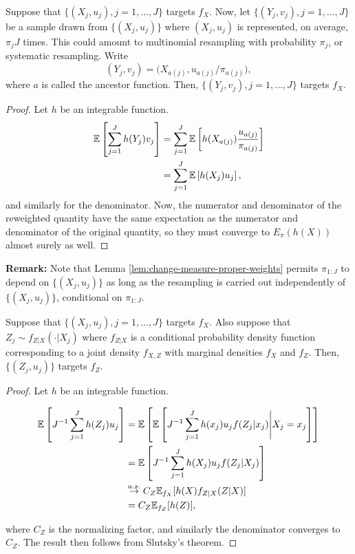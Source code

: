 \documentclass{article}
\begin{document}
\begin{lem}
    \label{lem:change-measure-proper-weights}
    Suppose that $\{(X_j,u_j),j=1,\dots,J\}$ targets $f_X$. Now, let $\{(Y_j,v_j),j=1,\dots,J\}$ be a sample drawn from $\{(X_j,u_j)\}$ where $(X_j,u_j)$ is represented, on average, $\pi_j J$ times. This could amount to multinomial resampling with probability $\pi_j$, or systematic resampling. Write
    \[
    (Y_j,v_j) = \big(X_{a(j)},u_{a(j)}/\pi_{a(j)}\big),
    \]
    where $a$ is called the ancestor function. Then, $\{(Y_j,v_j),j=1,\dots,J\}$ targets $f_X$.
\end{lem}

\begin{proof}
    Let $h$ be an integrable function. 
    \begin{align*}
        \mathbb{E}\left[\sum_{j=1}^J h(Y_j) v_j\right] 
        &= \sum_{j=1}^J \mathbb{E}\left[h(X_{a(j)}) \frac{u_{a(j)}}{\pi_{a(j)}}\right] \\
        &= \sum_{j=1}^J \mathbb{E}\left[h(X_{j}) u_{j}\right],
    \end{align*}
    and similarly for the denominator. Now, the numerator and denominator of the reweighted quantity have the same expectation as the numerator and denominator of the original quantity, so they must converge to $ E_\pi(h(X))$ almost surely as well. 
\end{proof}


\textbf{Remark:} Note that Lemma \ref{lem:change-measure-proper-weights} permits $\pi_{1:J}$ to depend on $\{(X_j,u_j)\}$ as long as the resampling is carried out independently of $\{(X_j,u_j)\}$, conditional on $\pi_{1:J}$.

\begin{lem}
    \label{lem:marginal-proper-weights}
    Suppose that $\{(X_j,u_j),j=1,\dots,J\}$ targets $f_X$. Also suppose that $Z_j \sim f_{Z|X}(\cdot | X_j)$ where $f_{Z|X}$ is a conditional probability density function corresponding to a joint density $f_{X,Z}$ with marginal densities $f_X$ and $f_Z$. Then, $\{(Z_j,u_j)\}$ targets $f_Z$.
\end{lem}
\begin{proof}
    Let $h$ be an integrable function. 

    \begin{align*}
        \mathbb{E}\left[J^{-1}\sum_{j=1}^J h(Z_j) u_j\right] &= \mathbb{E}\left[\mathbb{E}\left[J^{-1}\sum_{j=1}^J h(x_j) u_j f(Z_j|x_j)\Bigg| X_j=x_j\right]\right] \\
        &= \mathbb{E}\left[J^{-1}\sum_{j=1}^J h(X_j) u_j f(Z_j|X_j)\right] \\
        &\stackrel{a.s.}{\to} C_Z \mathbb{E}_{f_X}[h(X) f_{Z|X}(Z|X)] \\
        &= C_Z \mathbb{E}_{f_Z}[h(Z)],
    \end{align*}

    where $C_Z$ is the normalizing factor, and similarly the denominator converges to $C_Z$. The result then follows from Slutsky's theorem. 
    
\end{proof}
\end{document}
